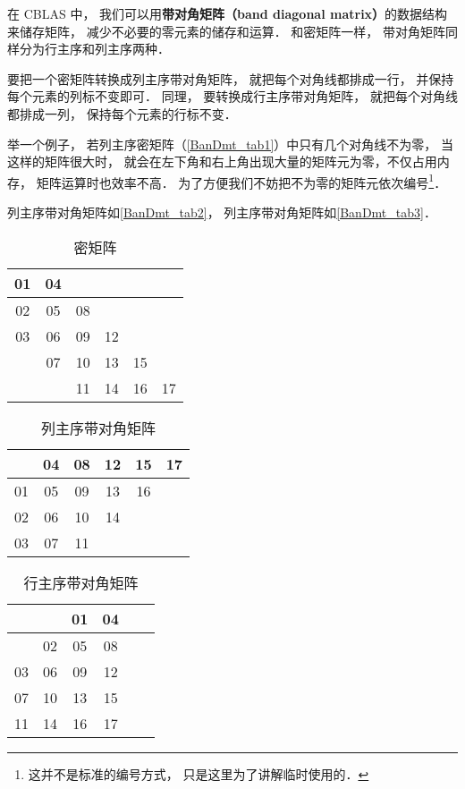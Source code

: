 

在 CBLAS 中， 我们可以用\textbf{带对角矩阵（band diagonal matrix）}的数据结构来储存矩阵， 减少不必要的零元素的储存和运算． 和密矩阵一样， 带对角矩阵同样分为行主序和列主序两种．

要把一个密矩阵转换成列主序带对角矩阵， 就把每个对角线都排成一行， 并保持每个元素的列标不变即可． 同理， 要转换成行主序带对角矩阵， 就把每个对角线都排成一列， 保持每个元素的行标不变．

举一个例子， 若列主序密矩阵（\autoref{BanDmt_tab1}）中只有几个对角线不为零， 当这样的矩阵很大时， 就会在左下角和右上角出现大量的矩阵元为零，不仅占用内存， 矩阵运算时也效率不高． 为了方便我们不妨把不为零的矩阵元依次编号\footnote{这并不是标准的编号方式， 只是这里为了讲解临时使用的．}．

列主序带对角矩阵如\autoref{BanDmt_tab2}， 列主序带对角矩阵如\autoref{BanDmt_tab3}．

\begin{table}[ht]
\centering
\caption{密矩阵}\label{BanDmt_tab1}
\begin{tabular}{|c|c|c|c|c|c|}
\hline
01  & 04  &    &    &    &   \\
\hline
02  & 05  & 08  &    &    &   \\
\hline
03  & 06  & 09  & 12  &    &   \\
\hline
   & 07  & 10 &  13  & 15  &   \\
\hline
   &    & 11 &  14  & 16  & 17 \\
\hline
\end{tabular}
\end{table}

\begin{table}[ht]
\centering
\caption{列主序带对角矩阵}\label{BanDmt_tab2}
\begin{tabular}{|c|c|c|c|c|c|}
\hline
   & 04  & 08  & 12 &  15 &  17 \\
\hline
01  & 05  & 09  & 13 &  16 &    \\
\hline
02  & 06  & 10 & 14 &     &    \\
\hline
03  & 07  & 11 &    &     &    \\
\hline
\end{tabular}
\end{table}

\begin{table}[ht]
\centering
\caption{行主序带对角矩阵}\label{BanDmt_tab3}
\begin{tabular}{|c|c|c|c|c|c|}
\hline
   &     &  01  &  04 \\
\hline
   &  02  &  05  &  08 \\
\hline
03  &  06  &  09  &  12 \\
\hline
07  &  10 &  13 &  15 \\
\hline
11 &  14 &  16 &  17 \\
\hline
\end{tabular}
\end{table}

